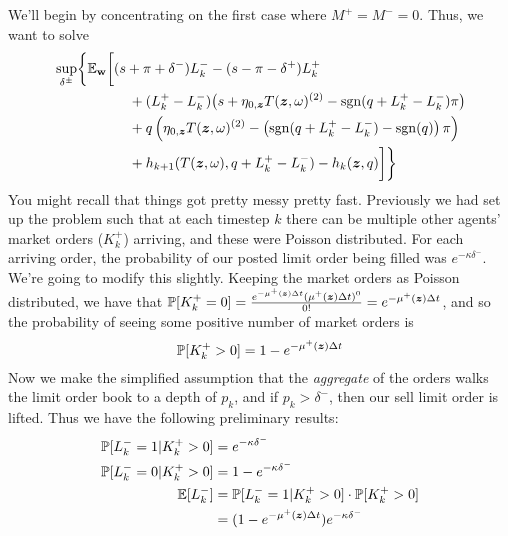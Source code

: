 We'll begin by concentrating on the first case where $M^+ = M^- = 0$. Thus, we want to solve
\begin{equation}
\label{eq:discretesup1}
\begin{split}
& \sup_{\delta^\pm} \biggl\lbrace \E_{\bw} \biggl[
(s + \pi + \delta^-)L_k^- - (s - \pi - \delta^+)L_k^+ \\
& \hphantom{\sup_{\bu} \biggl\lbrace \E_{\bw} \biggl[ {}+{}} + (L_k^+ - L_k^-) \bigl( s + \eta_{0,\bz} T(\bz, \omega)^{(2)}  -\sgn( q + L_k^+ - L_k^-)\pi   \bigr) \\
& \hphantom{\sup_{\bu} \biggl\lbrace \E_{\bw} \biggl[ {}+{}} + q\left( \eta_{0,\bz} T(\bz, \omega)^{(2)}  -\left( \sgn( q + L_k^+ - L_k^-) - \sgn(q) \right) \pi \right) \\
& \hphantom{\sup_{\bu} \biggl\lbrace \E_{\bw} \biggl[ {}+{}} + h_{k+1}(T(\bz,\omega), q + L_k^+ - L_k^- ) -  h_k(\bz,q) \biggr] \biggr\rbrace
\end{split}
\end{equation}
You might recall that things got pretty messy pretty fast. Previously we had set up the problem such that at each timestep $k$ there can be multiple other agents' market orders ($K_k^+$) arriving, and these were Poisson distributed. For each arriving order, the probability of our posted limit order being filled was $e^{-\kappa \delta^-}$. We're going to modify this slightly. Keeping the market orders as Poisson distributed, we have that $\mathbb{P} [ K_k^+ = 0] = \frac{e^{-\mu^+ (\bm{z}) \Delta t} (\mu^+ (\bm{z}) \Delta t)^0}{0!} = e^{-\mu^+ (\bm{z}) \Delta t}$, and so the probability of seeing some positive number of market orders is
\begin{equation}
\label{eq:discretepositiveKplus}
\mathbb{P} [ K_k^+ > 0] = 1 - e^{-\mu^+ (\bm{z}) \Delta t}
\end{equation}
Now we make the simplified assumption that the \textit{aggregate} of the orders walks the limit order book to a depth of $p_k$, and if $p_k > \delta^-$, then our sell limit order is lifted. Thus we have the following preliminary results:
\begin{align*}
\mathbb{P} [ L_k^- = 1 | K_k^+ > 0] & = e^{-\kappa \delta^-} \\
\mathbb{P} [ L_k^- = 0 | K_k^+ > 0] & = 1 - e^{-\kappa \delta^-} \\
\mathbb{E} [ L_k^- ] & = \mathbb{P} [ L_k^- = 1 | K_k^+ > 0] \cdot \mathbb{P}[K_k^+ > 0] \\
& = ( 1 - e^{-\mu^+ (\bm{z}) \Delta t} ) e^{-\kappa \delta^-} \\
\end{align*}
